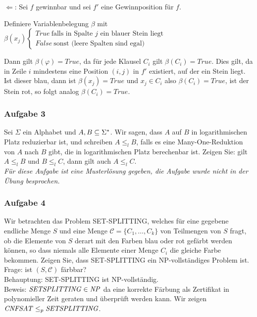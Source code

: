 \begin{enumerate}
            $\Leftarrow$: Sei $f$ gewinnbar und sei $f'$ eine Gewinnposition für $f$.

            Definiere Variablenbelegung $\beta$ mit $\beta(x_{j})
            \begin{cases}
                True\ \text{falls in Spalte $j$ ein blauer Stein liegt} \\
                False\ \text{sonst (leere Spalten sind egal)}
            \end{cases}$

            Dann gilt $\beta(\varphi) = True$, da für jede Klausel $C_{i}$ gilt $\beta(C_{i}) = True$. Dies gilt, da in Zeile $i$ mindestens eine Position $(i,j)$ in $f'$ existiert, auf der ein Stein liegt. Ist dieser blau, dann ist $\beta(x_{j}) = True$ und $x_{j} \in C_{i}$ also $\beta(C_{i}) = True$, ist der Stein rot, so folgt analog $\beta(C_{i}) = True$.
    \end{enumerate}


\subsubsection*{Aufgabe 3}
    Sei $\Sigma$ ein Alphabet und $A, B \subseteq \Sigma^{*}$. Wir sagen, dass $A$ auf $B$ in logarithmischen Platz reduzierbar ist, und schreiben $A \leq_{l} B$, falls es eine Many-One-Reduktion von $A$ nach $B$ gibt, die in logarithmischen Platz berechenbar ist. Zeigen Sie: gilt $A \leq_{l} B$ und $B \leq_{l} C$, dann gilt auch $A \leq_{l} C$. \\

    \textit{Für diese Aufgabe ist eine Musterlösung gegeben, die Aufgabe wurde nicht in der Übung besprochen.}


\subsubsection*{Aufgabe 4}
\newcommand{\C}{\mathcal{C}}
\newcommand{\SESP}{\MT{SETSPLITTING}}

    Wir betrachten das Problem SET-SPLITTING, welches für eine gegebene endliche Menge $S$ und eine Menge $\C = \{ C_{1}, \dots, C_{k}\}$ von Teilmengen von $S$ fragt, ob die Elemente von $S$ derart mit den Farben blau oder rot gefärbt werden können, so dass niemals alle Elemente einer Menge $C_{i}$ die gleiche Farbe bekommen. Zeigen Sie, dass SET-SPLITTING ein NP-vollständiges Problem ist. \\

    \LOES Frage: ist $(S, \C)$ färbbar? \\
    Behauptung: SET-SPLITTING ist NP-vollständig. \\
    Beweis: $\SESP \in \NP$ da eine korrekte Färbung als Zertifikat in polynomieller Zeit geraten und überprüft werden kann. Wir zeigen $\MT{CNFSAT} \leq_{p} \SESP$.{}

